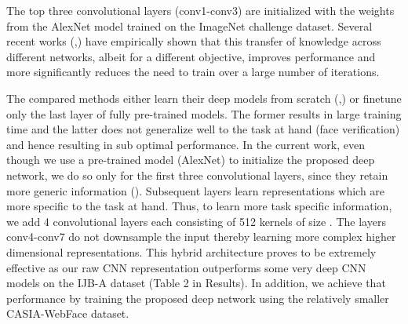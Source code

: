 \documentclass[10pt,twocolumn,letterpaper]{article}
\newenvironment{Table}
  {\par\bigskip\noindent\minipage{\columnwidth}\centering}
  {\endminipage\par\bigskip}
\begin{document}
\begin{Table}

\centering
{}
\label{arch}
\end{Table}


The top three convolutional layers (conv1-conv3) are initialized with the
weights from the AlexNet model \cite{alexnet12} trained on the ImageNet
challenge dataset. Several recent works (\cite{transfer1},\cite{transfer2}) have
empirically shown that this transfer of knowledge across different networks,
albeit for a different objective, improves performance and more significantly
reduces the need to train over a large number of iterations. 

The compared methods either learn their deep models from scratch
(\cite{parkhi15},\cite{nan}) or finetune only the last layer of fully
pre-trained models. The former results in large training time and the
latter does not generalize well to the task at hand (face verification) and
hence resulting in sub optimal performance. In the current work, even though we
use a pre-trained model (AlexNet) to initialize the proposed deep network, we do
so only for the first three convolutional layers, since they retain more generic
information (\cite{transfer1}). Subsequent layers learn representations which
are more specific to the task at hand. Thus, to learn more task specific
information, we add 4 convolutional layers each consisting of 512 kernels of
size . The layers conv4-conv7 do not downsample the input thereby
learning more complex higher dimensional representations. This hybrid
architecture proves to be extremely effective as our raw CNN representation
outperforms some very deep CNN models on the IJB-A dataset (Table 2 in Results).
In addition, we achieve that performance by training the proposed deep network using the
relatively smaller CASIA-WebFace dataset. 
\end{document}
